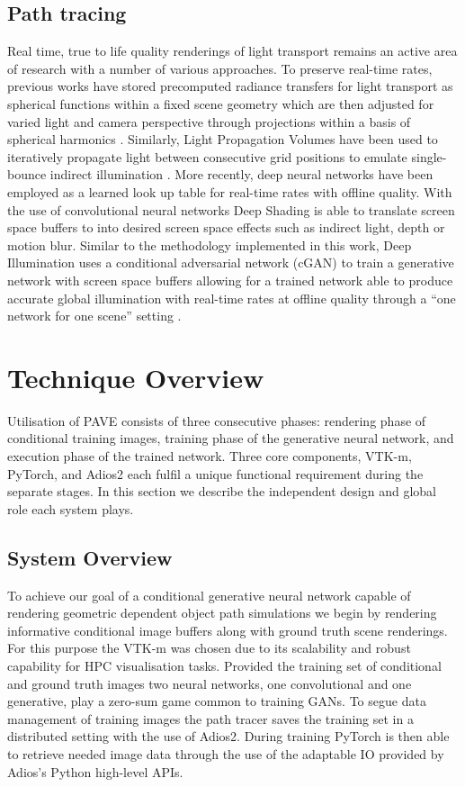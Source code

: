 \documentclass[conference]{IEEEtran}
\begin{document}
\subsection{Path tracing}
Real time, true to life quality renderings of light transport remains an active area of research with a number of various approaches. To preserve real-time rates, previous works have stored precomputed radiance transfers for light transport as spherical functions within a fixed scene geometry which are then adjusted for varied light and camera perspective through projections within a basis of spherical harmonics \cite{sloanPrecompRad}. Similarly, Light Propagation Volumes have been used to iteratively propagate light between consecutive grid positions to emulate single-bounce indirect illumination \cite{kaplanyanCasac}. More recently, deep neural  networks have been employed as a learned look up table for real-time rates with offline quality. With the use of convolutional neural networks Deep Shading is able to translate screen space buffers to into desired screen space effects such as indirect light, depth or motion blur. Similar to the methodology implemented in this work, Deep Illumination uses a conditional adversarial network (cGAN) to train a generative network with screen space buffers allowing for a trained network able to produce accurate global illumination with real-time rates at offline quality through a ``one network for one scene'' setting  \cite{deepillum}.

\section{Technique Overview}

Utilisation of PAVE consists of three consecutive phases: rendering phase of conditional training images, training phase of the generative neural network, and execution phase of the trained network. Three core components, VTK-m, PyTorch, and Adios2 each fulfil a unique functional requirement during the separate stages. In this section we describe the independent design and global role each system plays.

\subsection{System Overview}
 
To achieve our goal of a conditional generative neural network capable of rendering geometric dependent object path simulations we begin by rendering informative conditional image buffers along with ground truth scene renderings. For this purpose the VTK-m was chosen due to its scalability and robust capability for HPC visualisation tasks. Provided the training set of conditional and ground truth images two neural networks, one convolutional and one generative, play a zero-sum game common to training GANs. To segue data management of training images the path tracer saves the training set in a distributed setting with the use of Adios2. During training PyTorch is then able to retrieve needed image data through the use of the adaptable IO provided by Adios's Python high-level APIs.
\end{document}
